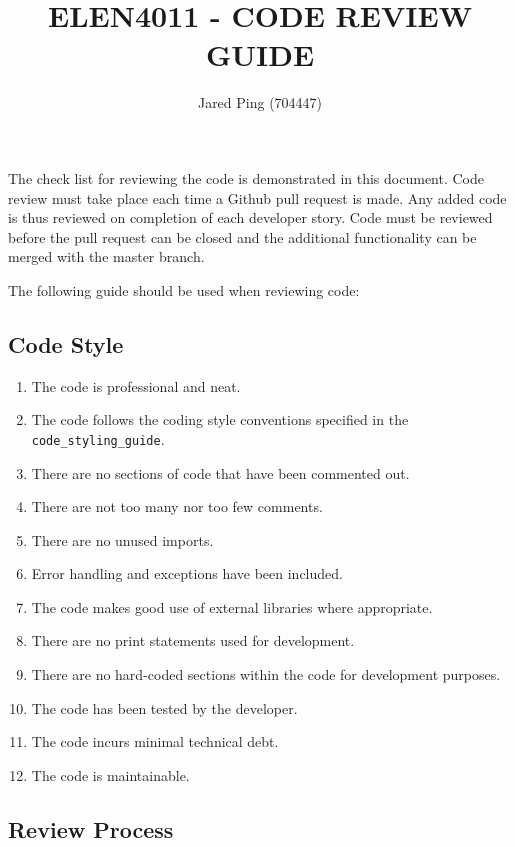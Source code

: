 \documentclass[10pt,onecolumn]{witseiepaper}
\title{ELEN4011 - CODE REVIEW GUIDE}
\author{Jared Ping (704447)}
\begin{document}
\maketitle
\pagestyle{plain}
\setcounter{page}{1}

The check list for reviewing the code is demonstrated in this document. Code review must take place each time a Github pull request is made. Any added code is thus reviewed on completion of each developer story. Code must be reviewed before the pull request can be closed and the additional functionality can be merged with the master branch.

The following guide should be used when reviewing code:

\vspace{3mm}
\subsection*{\textbf{Code Style}}

\begin{enumerate}
	\item The code is professional and neat.
	\item The code follows the coding style conventions specified in the \texttt{code\_styling\_guide}.
	\item There are no sections of code that have been commented out.
	\item There are not too many nor too few comments.
	\item There are no unused imports.
	\item Error handling and exceptions have been included.
	\item The code makes good use of external libraries where appropriate.
	\item There are no print statements used for development.
	\item There are no hard-coded sections within the code for development purposes.
	\item The code has been tested by the developer.
	\item The code incurs minimal technical debt.
	\item The code is maintainable.
	
\end{enumerate}

\vspace{3mm}
\subsection*{\textbf{Review Process}}
\end{document}
